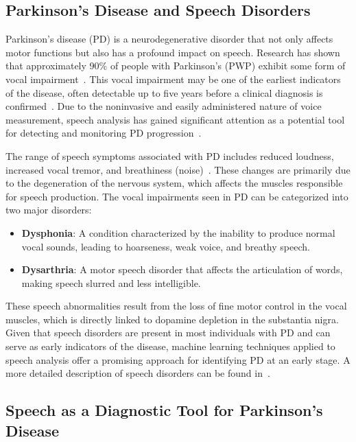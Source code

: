 \documentclass{paper}
\begin{document}
\subsection{Parkinson’s Disease and Speech Disorders}

Parkinson’s disease (PD) is a neurodegenerative disorder that not only affects motor functions but also has a profound impact on speech. Research has shown that approximately 90\% of people with Parkinson’s (PWP) exhibit some form of vocal impairment~\cite{ho1999speech, logemann1978frequency}. This vocal impairment may be one of the earliest indicators of the disease, often detectable up to five years before a clinical diagnosis is confirmed~\cite{duffy2012motor}. Due to the noninvasive and easily administered nature of voice measurement, speech analysis has gained significant attention as a potential tool for detecting and monitoring PD progression~\cite{sapir2007effects, rahn2007phonatory}.

The range of speech symptoms associated with PD includes reduced loudness, increased vocal tremor, and breathiness (noise)~\cite{tsanas2012novel}. These changes are primarily due to the degeneration of the nervous system, which affects the muscles responsible for speech production. The vocal impairments seen in PD can be categorized into two major disorders:

\begin{itemize}
    \item \textbf{Dysphonia}: A condition characterized by the inability to produce normal vocal sounds, leading to hoarseness, weak voice, and breathy speech.
    \item \textbf{Dysarthria}: A motor speech disorder that affects the articulation of words, making speech slurred and less intelligible.
\end{itemize}

These speech abnormalities result from the loss of fine motor control in the vocal muscles, which is directly linked to dopamine depletion in the substantia nigra. Given that speech disorders are present in most individuals with PD and can serve as early indicators of the disease, machine learning techniques applied to speech analysis offer a promising approach for identifying PD at an early stage. A more detailed description of speech disorders can be found in~\cite{baken1987clinical}.

\subsection{Speech as a Diagnostic Tool for Parkinson’s Disease}
\end{document}
